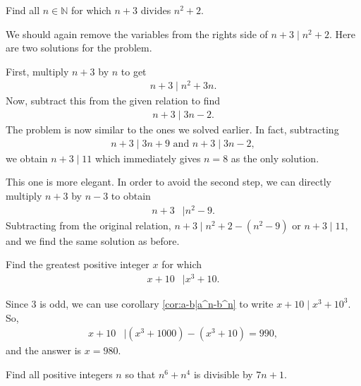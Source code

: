 \documentclass{subfile}
\begin{document}
		\begin{problem}\label{prob:n+3|n^2+2}
			Find all $n\in\mathbb{N}$ for which $n+3$ divides $n^2+2$.
		\end{problem}
	We should again remove the variables from the rights side of $n+3\mid n^2+2$. Here are two solutions for the problem.
		\begin{solution}
			 First, multiply $n+3$ by $n$ to get
				\begin{align*}
					n+3 \mid n^2+3n.
				\end{align*}
			Now, subtract this from the given relation to find
				\begin{align*}
					n+3 \mid 3n-2.
				\end{align*}
			The problem is now similar to the ones we solved earlier. In fact, subtracting
				\begin{align*}
					n+3 \mid 3n+9 \text{ and } n+3 \mid 3n-2,
				\end{align*}
			we obtain $n+3\mid 11$ which immediately gives $n=8$ as the only solution.
		\end{solution}

		\begin{solution}
			This one is more elegant. In order to avoid the second step, we can directly multiply $n+3$ by $n-3$ to obtain
			\begin{align*}
				n+3
					& \mid n^2-9.
			\end{align*}
			Subtracting from the original relation, $n+3 \mid n^2+2-(n^2-9)$ or $n+3\mid 11$, and we find the same solution as before.
		\end{solution}

		\begin{problem}
			Find the greatest positive integer $x$ for which
				\begin{align*}
					x+10
						& \mid x^3+10.
				\end{align*}
		\end{problem}

		\begin{solution}
			Since $3$ is odd, we can use corollary \eqref{cor:a-b|a^n-b^n} to write $x+10 \mid x^3+10^3$. So,
				\begin{align*}
					x+10
						& \mid (x^3+1000)-(x^3+10)=990,
				\end{align*}
			and the answer is $x=980$.
		\end{solution}

		\begin{problem}
			Find all positive integers $n$ so that $n^6+n^4$ is divisible by $7n+1$.
		\end{problem}
\end{document}
